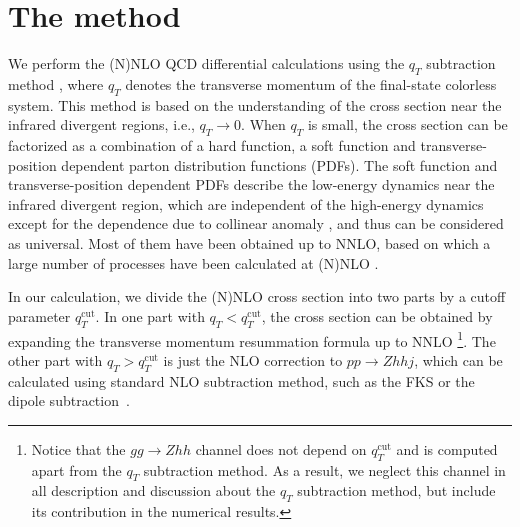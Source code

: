 \documentclass[a4paper,amsmath,preprintnumbers,showpacs,twocolumn,prl,superscriptaddress, nofootinbib]{revtex4}
\newcommand{\cut}{\textrm{cut}}
\begin{document}
\section{The method}
We perform the (N)NLO QCD differential calculations  using the  $q_T$ subtraction method  \cite{Catani:2007vq}, where $q_T$ denotes the transverse momentum of the final-state colorless system.
This method is based on the understanding of the cross section near the infrared divergent  regions,
i.e.,  $q_T\to 0$.
When $q_T$ is small,  the cross section can be factorized as a combination of  a hard function, a soft function and  transverse-position dependent parton distribution functions (PDFs). The soft function and transverse-position dependent  PDFs describe the low-energy dynamics near the infrared divergent region, which  are  independent of the high-energy  dynamics except for the dependence due to collinear anomaly \cite{Becher:2010tm}, and thus can be considered as universal. 
Most of them have been obtained up to NNLO, based on which a large number of processes
have been calculated at (N)NLO \cite{Catani:2007vq,Catani:2009sm,Catani:2011qz,Cascioli:2014yka,Ferrera:2014lca,Gehrmann:2014fva,Campbell:2016yrh,Grazzini:2016swo,Grazzini:2016ctr,deFlorian:2016uhr}.

In our calculation, we divide the (N)NLO cross section into two parts by a cutoff parameter $q_T^{\cut}$.
In one part with $q_T<q_T^{\cut}$,
the cross section can be obtained by expanding the transverse momentum resummation formula up to NNLO
\footnote{Notice that the $gg\to Zhh$ channel does not depend on $q_T^{\cut}$
and is computed apart from the $q_T$ subtraction method. As a result, 
we neglect this channel in all description and discussion about the $q_T$ subtraction method,
but include its contribution in the numerical results. }.
The other part  with $q_T>q_T^{\cut}$ is just the NLO correction to $pp\to Zhhj$,
which can be calculated using standard NLO subtraction method, 
such as the FKS \cite{Frixione:1995ms} or the dipole subtraction~\cite{Catani:1996vz}.
\end{document}
